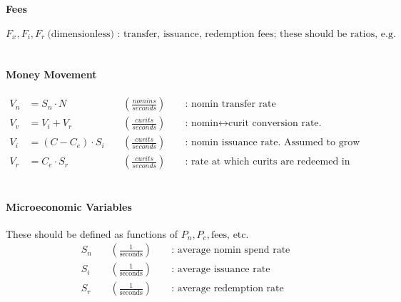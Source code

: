 \documentclass{article}
\begin{document}
\paragraph{Fees}
\[F_x, F_i, F_r \ \text{(dimensionless) : transfer, issuance, redemption fees; these should be ratios, e.g. 0.1\%}\]
\\

\paragraph{Money Movement}
\begin{align*}
    V_n &= S_n \cdot N \ && (\frac{nomins}{seconds}) && \text{ : nomin transfer rate} \\
    V_v &= V_i + V_r \ && (\frac{curits}{seconds}) && \text{ : nomin} \leftrightarrow \text{curit conversion rate.} \\
    V_i &= (C - C_e) \cdot S_i \ && (\frac{curits}{seconds}) && \text{ : nomin issuance rate. Assumed to grow as there are more free curits in the system (actually should probably grow with the number of escrowed but unissued nomins).} \\
    V_r &= C_e \cdot S_r \ && (\frac{curits}{seconds}) && \text{ : rate at which curits are redeemed in return for nomins (which are burned). Assumed to grow proportionally with the number of escrowed curits.}
\end{align*}
\\

\paragraph{Microeconomic Variables} These should be defined as functions of \(P_n, P_c, \text{fees, etc.}\)
\begin{align*}
S_n \ && (\frac{1}{\text{seconds}}) && \text{ : average nomin spend rate} \\
S_i \ && (\frac{1}{\text{seconds}}) && \text{ : average issuance rate} \\
S_r \ && (\frac{1}{\text{seconds}}) && \text{ : average redemption rate}
\end{align*}
\end{document}

